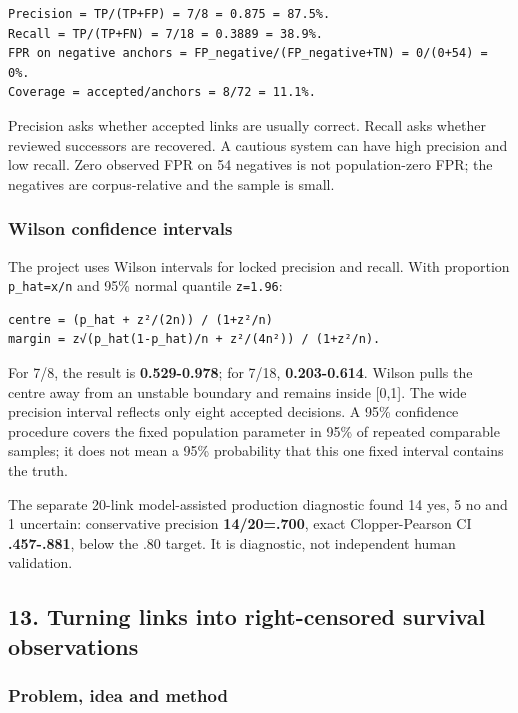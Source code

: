 \begin{verbatim}
Precision = TP/(TP+FP) = 7/8 = 0.875 = 87.5%.
Recall = TP/(TP+FN) = 7/18 = 0.3889 = 38.9%.
FPR on negative anchors = FP_negative/(FP_negative+TN) = 0/(0+54) = 0%.
Coverage = accepted/anchors = 8/72 = 11.1%.
\end{verbatim}

Precision asks whether accepted links are usually correct. Recall asks
whether reviewed successors are recovered. A cautious system can have
high precision and low recall. Zero observed FPR on 54 negatives is not
population-zero FPR; the negatives are corpus-relative and the sample is
small.

\subsubsection{Wilson confidence
intervals}\label{wilson-confidence-intervals}

The project uses Wilson intervals for locked precision and recall. With
proportion \texttt{p\_hat=x/n} and 95\% normal quantile \texttt{z=1.96}:

\begin{verbatim}
centre = (p_hat + z²/(2n)) / (1+z²/n)
margin = z√(p_hat(1-p_hat)/n + z²/(4n²)) / (1+z²/n).
\end{verbatim}

For 7/8, the result is \textbf{0.529-0.978}; for 7/18,
\textbf{0.203-0.614}. Wilson pulls the centre away from an unstable
boundary and remains inside {[}0,1{]}. The wide precision interval
reflects only eight accepted decisions. A 95\% confidence procedure
covers the fixed population parameter in 95\% of repeated comparable
samples; it does not mean a 95\% probability that this one fixed
interval contains the truth.

The separate 20-link model-assisted production diagnostic found 14 yes,
5 no and 1 uncertain: conservative precision \textbf{14/20=.700}, exact
Clopper-Pearson CI \textbf{.457-.881}, below the .80 target. It is
diagnostic, not independent human validation.

\subsection{13. Turning links into right-censored survival
observations}\label{13-turning-links-into-right-censored-survival-observations}

\subsubsection{Problem, idea and method}\label{problem-idea-and-method}


